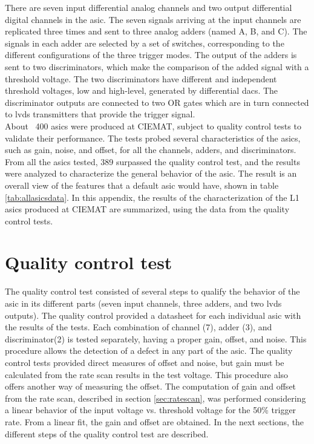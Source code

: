 \documentclass[main.tex]{subfiles}
\begin{document}
There are seven input differential analog channels and two output differential digital channels in the \gls{asic}. The seven signals arriving at the input channels are replicated three times and sent to three analog adders (named A, B, and C). The signals in each adder are selected by a set of switches, corresponding to the different configurations of the three trigger modes.
The output of the adders is sent to two discriminators, which make the comparison of the added signal with a threshold voltage.
The two discriminators have different and independent threshold voltages, low and high-level, generated by differential \glspl{dac}.
The discriminator outputs are connected to two OR gates which are in turn connected to \gls{lvds} transmitters that provide the trigger signal.\\
About ~400 \glspl{asic} were produced at CIEMAT, subject to quality control tests to validate their performance. The tests probed several characteristics of the \glspl{asic}, such as gain, noise, and offset, for all the channels, adders, and discriminators. From all the \glspl{asic} tested, 389 surpassed the quality control test, and the results were analyzed to characterize the general behavior of the \gls{asic}. The result is an overall view of the features that a default \gls{asic} would have, shown in table \ref{tab:allasicsdata}. In this appendix, the results of the characterization of the L1 \glspl{asic} produced at CIEMAT are summarized, using the data from the quality control tests.

\section{Quality control test}

The quality control test consisted of several steps to qualify the behavior of the \gls{asic} in its different parts (seven input channels, three adders, and two \gls{lvds} outputs).
The quality control provided a datasheet for each individual \gls{asic} with the results of the tests. Each combination of channel (7), adder (3), and discriminator(2) is tested separately, having a proper gain, offset, and noise. This procedure allows the detection of a defect in any part of the \gls{asic}. The quality control tests provided direct measures of offset and noise, but gain must be calculated from the rate scan results in the test voltage. This procedure also offers another way of measuring the offset. The computation of gain and offset from the rate scan, described in section \ref{sec:ratescan}, was performed considering a linear behavior of the input voltage vs. threshold voltage for the 50\% trigger rate. From a linear fit, the gain and offset are obtained. In the next sections, the different steps of the quality control test are described.
\end{document}
